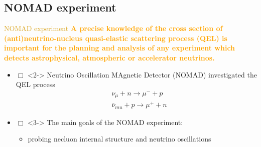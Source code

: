 \documentclass[11pt]{beamer} %
\renewcommand{\(}{\begin{columns}}
\renewcommand{\)}{\end{columns}}
\newcommand{\<}[1]{\begin{column}{#1}}
\renewcommand{\>}{\end{column}}
\newcommand{\itt}{\begin{itemize}}
\newcommand{\tti}{\end{itemize}}
\newcommand{\hlt}[2]{\textcolor{#1}{\textbf{#2}}}
\begin{document}
\subsection{NOMAD experiment}
\begin{frame}{\textcolor{Goldenrod}{NOMAD experiment}}
  \hlt{Orange}{A precise knowledge of the cross section of (anti)neutrino-nucleus
    quasi-elastic scattering process (QEL) is important for the planning
    and analysis of any experiment which detects astrophysical,
    atmospheric or accelerator neutrinos.}
  
  
  \itt
\item[$\Box$]<2-> Neutrino Oscillation MAgnetic Detector (NOMAD)
  investigated the QEL process
  \[
    \begin{aligned}
      &\nu_{\mu} + n \to \mu^- + p \\
      &\bar{\nu}_{mu} + p \to \mu^+ + n
    \end{aligned}
  \]
\item[$\Box$]<3-> The main goals of the NOMAD experiment:
  \itt
\item<3-> probing necluon internal structure and neutrino
  oscillations
  \tti
  \tti
\end{frame}
\end{document}
